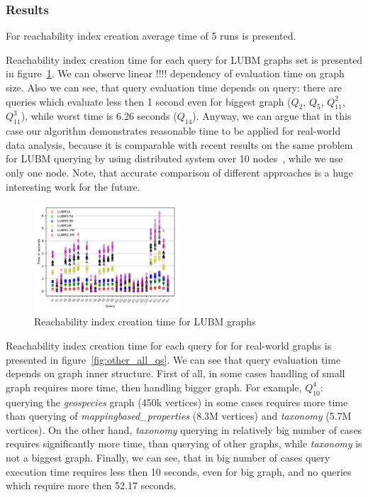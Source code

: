 \subsubsection{Results}

For reachability index creation average time of 5 runs is presented.

Reachability index creation time for each query for LUBM graphs set is presented in figure~\ref{fig:lubm_all_qs}.
We can observe linear !!!! dependency of evaluation time on graph size.
Also we can see, that query evaluation time depends on query: there are queries which evaluate less then 1 second even for biggest graph ($Q_2$, $Q_5$, $Q_{11}^2$, $Q_{11}^3$), while worst time is 6.26 seconds ($Q_{14}$).
Anyway, we can argue that in this case our algorithm demonstrates reasonable time to be applied for real-world data analysis, because it is comparable with recent results on the same problem for LUBM querying by using distributed system over 10 nodes~\cite{Wang2019}, while we use only one node. 
Note, that accurate comparison of different approaches is a huge interesting work for the future.

\begin{figure}
   \includegraphics[width=0.48\textwidth]{data/LUBM_all.pdf}
   \caption{Reachability index creation time for LUBM graphs}
   \label{fig:lubm_all_qs}
\end{figure}

Reachability index creation time for each query for for real-world graphs is presented in figure~\ref{fig:other_all_qs}.
We can see that query evaluation time depends on graph inner structure. 
First of all, in some cases handling of small graph requires more time, then handling bigger graph.
For example, $Q_{10}^4$: querying the \textit{geospecies} graph (450k vertices) in some cases requires more time than querying of \textit{mappingbased\_properties} (8.3M vertices) and \textit{taxonomy} (5.7M vertices).
On the other hand, \textit{taxonomy} querying in relatively big number of cases requires significantly more time, than querying of other graphs, while \textit{taxonomy} is not a biggest graph. 
Finally, we can see, that in big number of cases query execution time requires less then 10 seconds, even for big graph, and no queries which require more then 52.17 seconds. 


